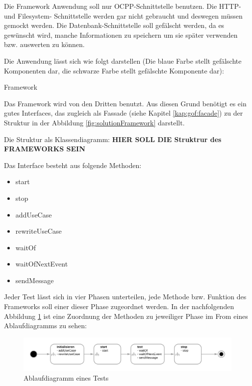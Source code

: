 Die Framework Anwendung soll nur OCPP-Schnittstelle benutzen. 
Die HTTP- und Filesystem- Schnittstelle werden gar nicht gebraucht und deswegen müssen gemockt werden.
Die Datenbank-Schnittstelle soll gefälscht werden, da es gewünscht wird, 
manche Informationen zu speichern um sie später verwenden bzw. auswerten zu können.

Die Anwendung lässt sich wie folgt darstellen 
(Die blaue Farbe stellt gefälschte Komponenten dar, die schwarze Farbe stellt gefälschte Komponente dar):

{Framework}

\newpage
Das Framework wird von den Dritten benutzt. Aus diesen Grund benötigt es ein gutes Interfaces, 
das zugleich als Fassade (siehe Kapitel \ref{kap:gof:facade}) zu der Struktur in der Abbildung \ref{fig:solutionFramework} darstellt.

Die Struktur als Klassendiagramm:
\textbf{HIER SOLL DIE Struktrur des FRAMEWORKS SEIN}

Das Interface besteht aus folgende Methoden:
\begin{itemize}
    \item start
    \item stop
    \item addUseCase
    \item rewriteUseCase
    \item waitOf
    \item waitOfNextEvent
    \item sendMessage
\end{itemize}

Jeder Test lässt sich in vier Phasen unterteilen, jede Methode bzw. Funktion des Frameworks soll einer dieser Phase zugeordnet werden.
In der nachfolgenden Abbildung \ref{fig:TestFlow} ist eine Zuordnung der Methoden zu jeweiliger Phase im From eines Ablaufdiagramms zu sehen:

\begin{figure}[H]
    \centering
    \includegraphics[width=1\textwidth]{./images/TestAblauf.png}
    \caption[Ablaufdiagramm eines Tests]{Ablaufdiagramm eines Tests}
    \label{fig:TestFlow}
\end{figure}